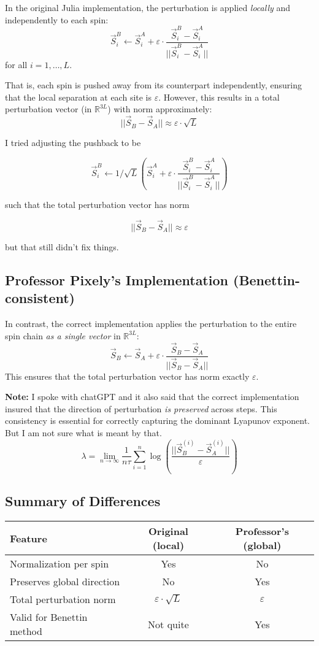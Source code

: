 \documentclass{article}
\begin{document}
In the original Julia implementation, the perturbation is applied \emph{locally} and independently to each spin:
\[
\vec{S}_{i}^{B} \gets \vec{S}_{i}^{A} + \varepsilon \cdot \frac{\vec{S}_{i}^{B} - \vec{S}_{i}^{A}}{||\vec{S}_{i}^{B} - \vec{S}_{i}^{A}||}
\]
for all $i = 1, \dots, L$.

That is, each spin is pushed away from its counterpart independently, ensuring that the local separation at each site is $\varepsilon$. However, this results in a total perturbation vector (in $\mathbb{R}^{3L}$) with norm approximately:
\[
||\vec{S}_B - \vec{S}_A|| \approx \varepsilon \cdot \sqrt{L}
\]

I tried adjusting the pushback to be

\[
\vec{S}_{i}^{B} \gets 1/\sqrt{L} (\vec{S}_{i}^{A} + \varepsilon \cdot \frac{\vec{S}_{i}^{B} - \vec{S}_{i}^{A}}{||\vec{S}_{i}^{B} - \vec{S}_{i}^{A}||})
\]

such that the total perturbation vector has norm

\[
||\vec{S}_B - \vec{S}_A|| \approx \varepsilon
\]

but that still didn't fix things.

\subsection*{Professor Pixely's Implementation (Benettin-consistent)}

In contrast, the correct implementation applies the perturbation to the entire spin chain \emph{as a single vector} in $\mathbb{R}^{3L}$:
\[
\vec{S}_B \gets \vec{S}_A + \varepsilon \cdot \frac{\vec{S}_B - \vec{S}_A}{||\vec{S}_B - \vec{S}_A||}
\]
This ensures that the total perturbation vector has norm exactly $\varepsilon$.

\textbf{Note: } I spoke with chatGPT and it also said that the correct implementation insured that the direction of perturbation \emph{is preserved} across steps. This consistency is essential for correctly capturing the dominant Lyapunov exponent. But I am not sure what is meant by that.
\[
\lambda = \lim_{n \to \infty} \frac{1}{n \tau} \sum_{i=1}^n \log \left( \frac{||\vec{S}_B^{(i)} - \vec{S}_A^{(i)}||}{\varepsilon} \right)
\]

\subsection*{Summary of Differences}

\begin{center}
\begin{tabular}{|l|c|c|}
\hline
\textbf{Feature} & \textbf{Original (local)} & \textbf{Professor's (global)} \\
\hline
Normalization per spin & Yes & No \\
Preserves global direction & No & Yes \\
Total perturbation norm & $\varepsilon \cdot \sqrt{L}$ & $\varepsilon$ \\
Valid for Benettin method & Not quite & Yes \\
\hline
\end{tabular}
\end{center}
\end{document}
